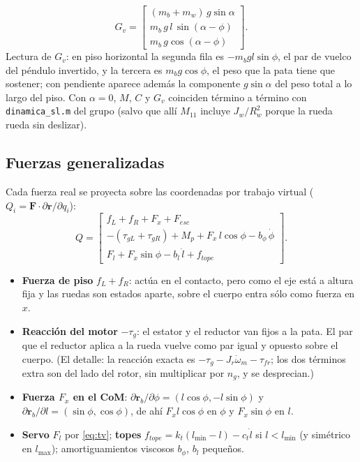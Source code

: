 \documentclass[11pt,a4paper]{article}
\newcommand{\code}[1]{\texttt{#1}}
\begin{document}
\begin{equation}
  G_v = \begin{bmatrix} (m_b+m_w)\,g\sin\alpha \\[2pt] m_b\,g\,l\,\sin(\alpha-\phi) \\[2pt] m_b\,g\cos(\alpha-\phi) \end{bmatrix}.
\end{equation}
Lectura de $G_v$: en piso horizontal la segunda fila es $-m_b g l\sin\phi$, el par de vuelco del
péndulo invertido, y la tercera es $m_b g\cos\phi$, el peso que la pata tiene que sostener; con
pendiente aparece además la componente $g\sin\alpha$ del peso total a lo largo del piso. Con
$\alpha = 0$, $M$, $C$ y $G_v$ coinciden término a término con \code{dinamica\_sl.m} del grupo
(salvo que allí $M_{11}$ incluye $J_w/R_w^2$ porque la rueda rueda sin deslizar).

\subsection{Fuerzas generalizadas}

Cada fuerza real se proyecta sobre las coordenadas por trabajo virtual ($Q_i = \bm F\cdot\partial\bm r/\partial q_i$):
\begin{equation}
  Q = \begin{bmatrix}
      f_L + f_R + F_x + F_{esc} \\[3pt]
      -(\tau_{gL} + \tau_{gR}) + M_p + F_x\, l\cos\phi - b_\phi\,\dot\phi \\[3pt]
      F_l + F_x\sin\phi - b_l\,\dot l + f_{tope}
      \end{bmatrix}.
  \label{eq:Q}
\end{equation}
\begin{itemize}\itemsep2pt
  \item \textbf{Fuerza de piso} $f_L + f_R$: actúa en el contacto, pero como el eje está a altura fija
  y las ruedas son estados aparte, sobre el cuerpo entra sólo como fuerza en $x$.
  \item \textbf{Reacción del motor} $-\tau_g$: el estator y el reductor van fijos a la pata. El par
  que el reductor aplica a la rueda vuelve como par igual y opuesto sobre el cuerpo. (El detalle: la
  reacción exacta es $-\tau_g - J_r\dot\omega_m - \tau_{fr}$; los dos términos extra son del lado del
  rotor, sin multiplicar por $n_g$, y se desprecian.)
  \item \textbf{Fuerza $F_x$ en el CoM}: $\partial\bm r_b/\partial\phi = (l\cos\phi, -l\sin\phi)$ y
  $\partial\bm r_b/\partial l = (\sin\phi, \cos\phi)$, de ahí $F_x l\cos\phi$ en $\phi$ y $F_x\sin\phi$ en $l$.
  \item \textbf{Servo} $F_l$ por \eqref{eq:tv}; \textbf{topes} $f_{tope} = k_t(l_{\min} - l) - c_t\dot l$
  si $l < l_{\min}$ (y simétrico en $l_{\max}$); amortiguamientos viscosos $b_\phi$, $b_l$ pequeños.
\end{itemize}
\end{document}
